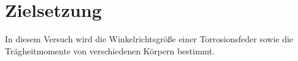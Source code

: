 \section{Zielsetzung}
\label{sec:Zielsetzung}
In diesem Versuch wird die Winkelrichtsgröße einer Torrosionsfeder sowie die
Trägheitmomente von verschiedenen Körpern bestimmt.

